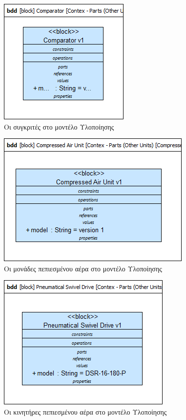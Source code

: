\documentclass[a4paper,12pt,twoside]{report}
\begin{document}
{\begin{appendices}
				\begin{figure}[hp]
					\centering
					\includegraphics[scale=0.50]{DesignModel_Contex-Parts(OtherUnits)[Comparators].png}
					\caption{Οι συγκριτές στο μοντέλο Υλοποίησης}
					\label{φωτ:Οι συγκριτές στο μοντέλο Υλοποίησης}
				\end{figure}
				
				\begin{figure}[hp]
					\centering
					\includegraphics[scale=0.50]{DesignModel_Contex-Parts(OtherUnits)[CompressedAirUnit].png}
					\caption{Οι μονάδες πεπιεσμένου αέρα στο μοντέλο Υλοποίησης}
					\label{φωτ:Οι μονάδες πεπιεσμένου αέρα στο μοντέλο Υλοποίησης}
				\end{figure}
				
				\begin{figure}[hp]
					\centering
					\includegraphics[scale=0.50]{DesignModel_Contex-Parts(OtherUnits)[PneumaticalSwivelDrive].png}
					\caption{Οι κινητήρες πεπιεσμένου αέρα στο μοντέλο Υλοποίησης}
					\label{φωτ:Οι κινητήρες πεπιεσμένου αέρα στο μοντέλο Υλοποίησης}
				\end{figure}
				

\end{appendices}}
\end{document}
